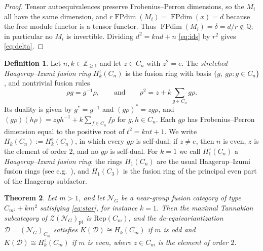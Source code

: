 \documentclass[10pt]{article}
\theoremstyle{plain}
\newtheorem{theorem}{Theorem}[section]
\theoremstyle{definition}
\newtheorem{definition}[theorem]{Definition}
\theoremstyle{plain}
\begin{document}
\begin{proof}
Tensor autoequivalences preserve Frobenius--Perron dimensions, so the $M_i$ all have the same dimension, and $r\operatorname{FPdim}(M_i)=\operatorname{FPdim}(x)=d$ because the free module functor is a tensor functor. Thus $\operatorname{FPdim}(M_i)=\delta=d/r\notin\mathbb{Q}$; in particular no $M_i$ is invertible. Dividing $d^{2}=knd+n$ \eqref{eq:ids} by $r^{2}$ gives \eqref{eq:delta}.
\end{proof}
 
\begin{definition}\label{def:haagerup}
Let $n,k\in\mathbb{Z}_{\geq1}$ and let $z\in C_n$ with $z^2=e$. The \emph{stretched Haagerup--Izumi fusion ring} $H_k^z(C_n)$ is the fusion ring with basis $\{g,\ g\rho:g\in C_n\}$, and nontrivial fusion rules
\begin{equation}\label{eq:haagring}
  \rho g=g^{-1}\rho,\qquad\text{and}\qquad \rho^2=z+k\sum_{g\in C_n}g\rho .
\end{equation}
Its duality is given by $g^\ast=g^{-1}$ and $(g\rho)^\ast=zg\rho$, and $(g\rho)(h\rho)=zgh^{-1}+k\sum_{f\in C_n}f\rho$ for $g,h\in C_n$. Each $g\rho$ has Frobenius--Perron dimension equal to the positive root of $t^2=knt+1$. We write $H_k(C_n):=H_k^e(C_n)$, in which every $g\rho$ is self-dual; if $z\neq e$, then $n$ is even, $z$ is the element of order $2$, and no $g\rho$ is self-dual. For $k=1$ we call $H_1^z(C_n)$ a \emph{Haagerup--Izumi fusion ring}; the rings $H_1(C_n)$ are the usual Haagerup--Izumi fusion rings (see e.g.\ \cite{MR2837122}), and $H_1(C_3)$ is the fusion ring of the principal even part of the Haagerup subfactor.
\end{definition}

\begin{theorem}\label{thm:haagerup}
Let $m>1$, and let $\mathcal{N}_G$ be a near-group fusion category of type $C_{m^2}+km^2$ satisfying \eqref{eq:star}, for instance $k=1$. Then the maximal Tannakian subcategory of $\mathcal{Z}(\mathcal{N}_G)_\mathrm{pt}$ is $\mathrm{Rep}(C_m)$, and the de-equivariantization $\mathcal{D}=(\mathcal{N}_G)_{C_m}$ satisfies $K(\mathcal{D})\cong H_k(C_m)$ if $m$ is odd and $K(\mathcal{D})\cong H_k^z(C_m)$ if $m$ is even, where $z\in C_m$ is the element of order $2$.
\end{theorem}
\end{document}
